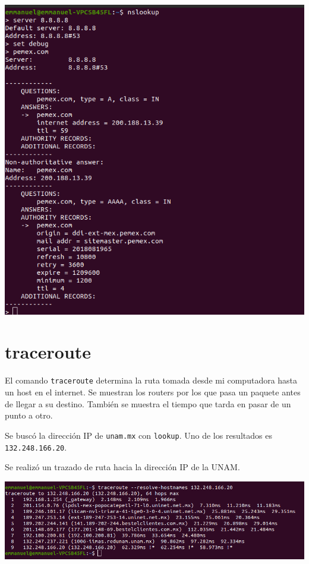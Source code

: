 \documentclass{article}
\begin{document}
\includegraphics[width=\linewidth]{imagenes/nslookup_pemex}

\section{traceroute}

El comando \texttt{traceroute} determina la ruta tomada desde mi computadora hasta un host en el internet. Se muestran los routers por los que pasa un paquete antes de llegar a su destino. También se muestra el tiempo que tarda en pasar de un punto a otro.

Se buscó la dirección IP de \texttt{unam.mx} con \texttt{lookup}. Uno de los resultados es \texttt{132.248.166.20}.

Se realizó un trazado de ruta hacia la dirección IP de la UNAM.

\includegraphics[width=\linewidth]{imagenes/traceroute_unam}
\end{document}
